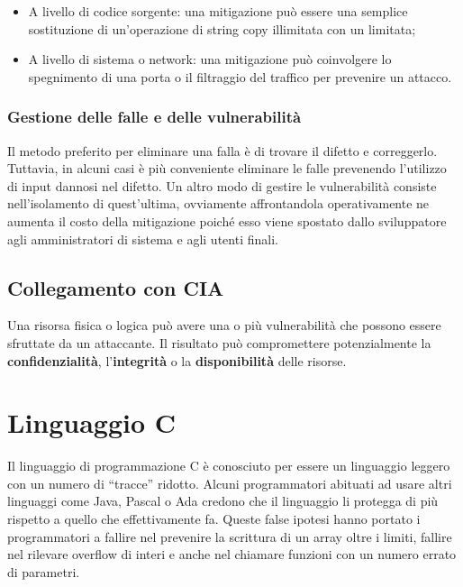 \begin{itemize}
    \item A livello di codice sorgente: una mitigazione può essere una semplice
          sostituzione di un'operazione di string copy illimitata con un limitata;
    \item A livello di sistema o network: una mitigazione può coinvolgere lo
          spegnimento di una porta o il filtraggio del traffico per prevenire un attacco.
\end{itemize}

\subsection{Gestione delle falle e delle vulnerabilità}

Il metodo preferito per eliminare una falla è di trovare il difetto e correggerlo.
Tuttavia, in alcuni casi è più conveniente eliminare le falle prevenendo l'utilizzo
di input dannosi nel difetto. Un altro modo di gestire le vulnerabilità consiste
nell'isolamento di quest'ultima, ovviamente affrontandola operativamente ne aumenta
il costo della mitigazione poiché esso viene spostato dallo sviluppatore agli
amministratori di sistema e agli utenti finali.

\section{Collegamento con CIA}

Una risorsa fisica o logica può avere una o più vulnerabilità che possono essere
sfruttate da un attaccante. Il risultato può compromettere potenzialmente
la \textbf{confidenzialità}, l'\textbf{integrità} o la \textbf{disponibilità}
delle risorse.

\chapter{Linguaggio C}

Il linguaggio di programmazione C è conosciuto per essere un linguaggio leggero con
un numero di ``tracce'' ridotto.
Alcuni programmatori abituati ad usare altri linguaggi come Java, Pascal o Ada
credono che il linguaggio li protegga di più rispetto a quello che effettivamente fa.
Queste false ipotesi hanno portato i programmatori a fallire nel prevenire la
scrittura di un array oltre i limiti, fallire nel rilevare overflow di interi e
anche nel chiamare funzioni con un numero errato di parametri.

